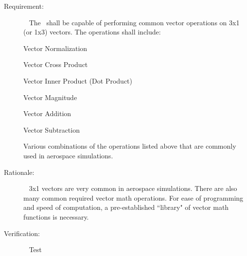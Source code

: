 \label{reqt:vector_math_operations}
\begin{description}
\item[Requirement:]\ \newline
The \mathDesc\ shall be capable of performing common vector operations on 
3x1 (or 1x3) vectors. The operations shall include:

   \subrequirement{}
   Vector Normalization

   \subrequirement{}
   Vector Cross Product

   \subrequirement{}
   Vector Inner Product (Dot Product)

   \subrequirement{}
   Vector Magnitude

   \subrequirement{}
   Vector Addition

   \subrequirement{}
   Vector Subtraction

   \subrequirement{}
   Various combinations of the operations listed above that are commonly
   used in aerospace simulations.

\item[Rationale:]\ \newline
3x1 vectors are very common in aerospace simulations.  There are also many
common required vector math operations. For ease of programming
and speed of computation, a pre-established ``library" of vector math functions
is necessary.

\item[Verification:]\ \newline
Test

\end{description}

%
%      
%   
%
%



